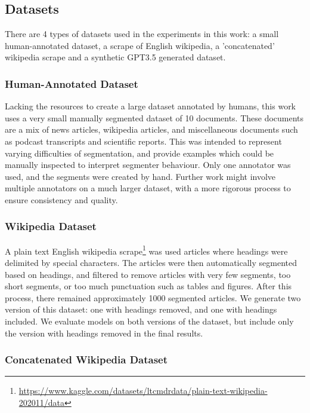 \subsection{Datasets}

There are 4 types of datasets used in the experiments in this work: a small human-annotated dataset, a scrape of English wikipedia, a 'concatenated' wikipedia scrape and a synthetic GPT3.5 generated dataset.

\subsubsection{Human-Annotated Dataset}

Lacking the resources to create a large dataset annotated by humans, this work uses a very small manually segmented dataset of 10 documents. These documents are a mix of news articles, wikipedia articles, and miscellaneous documents such as podcast transcripts and scientific reports. This was intended to represent varying difficulties of segmentation, and provide examples which could be manually inspected to interpret segmenter behaviour. Only one annotator was used, and the segments were created by hand. Further work might involve multiple annotators on a much larger dataset, with a more rigorous process to ensure consistency and quality.

\subsubsection{Wikipedia Dataset}

A plain text English wikipedia scrape\footnote{\url{https://www.kaggle.com/datasets/ltcmdrdata/plain-text-wikipedia-202011/data}} was used articles where headings were delimited by special characters. The articles were then automatically segmented based on headings, and filtered to remove articles with very few segments, too short segments, or too much punctuation such as tables and figures. After this process, there remained approximately 1000 segmented articles. We generate two version of this dataset: one with headings removed, and one with headings included. We evaluate models on both versions of the dataset, but include only the version with headings removed in the final results.

\subsubsection{Concatenated Wikipedia Dataset}

